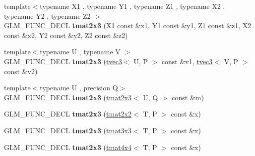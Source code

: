 \begin{DoxyCompactItemize}
\item 
{\footnotesize template$<$typename X1 , typename Y1 , typename Z1 , typename X2 , typename Y2 , typename Z2 $>$ }\\G\+L\+M\+\_\+\+F\+U\+N\+C\+\_\+\+D\+E\+CL {\bfseries tmat2x3} (X1 const \&x1, Y1 const \&y1, Z1 const \&z1, X2 const \&x2, Y2 const \&y2, Z2 const \&z2)\hypertarget{structglm_1_1detail_1_1tmat2x3_ac112d37bc3331b1735c1aeb591483bc0}{}\label{structglm_1_1detail_1_1tmat2x3_ac112d37bc3331b1735c1aeb591483bc0}

\item 
{\footnotesize template$<$typename U , typename V $>$ }\\G\+L\+M\+\_\+\+F\+U\+N\+C\+\_\+\+D\+E\+CL {\bfseries tmat2x3} (\hyperlink{structglm_1_1detail_1_1tvec3}{tvec3}$<$ U, P $>$ const \&v1, \hyperlink{structglm_1_1detail_1_1tvec3}{tvec3}$<$ V, P $>$ const \&v2)\hypertarget{structglm_1_1detail_1_1tmat2x3_ab39c2ee73d04fb527773418e6595be57}{}\label{structglm_1_1detail_1_1tmat2x3_ab39c2ee73d04fb527773418e6595be57}

\item 
{\footnotesize template$<$typename U , precision Q$>$ }\\G\+L\+M\+\_\+\+F\+U\+N\+C\+\_\+\+D\+E\+CL {\bfseries tmat2x3} (\hyperlink{structglm_1_1detail_1_1tmat2x3}{tmat2x3}$<$ U, Q $>$ const \&m)\hypertarget{structglm_1_1detail_1_1tmat2x3_aeada8034e24714a14c9d2480f5cf2fb6}{}\label{structglm_1_1detail_1_1tmat2x3_aeada8034e24714a14c9d2480f5cf2fb6}

\item 
G\+L\+M\+\_\+\+F\+U\+N\+C\+\_\+\+D\+E\+CL {\bfseries tmat2x3} (\hyperlink{structglm_1_1detail_1_1tmat2x2}{tmat2x2}$<$ T, P $>$ const \&x)\hypertarget{structglm_1_1detail_1_1tmat2x3_a37bd9202b87e73c3d6e36cadce414457}{}\label{structglm_1_1detail_1_1tmat2x3_a37bd9202b87e73c3d6e36cadce414457}

\item 
G\+L\+M\+\_\+\+F\+U\+N\+C\+\_\+\+D\+E\+CL {\bfseries tmat2x3} (\hyperlink{structglm_1_1detail_1_1tmat3x3}{tmat3x3}$<$ T, P $>$ const \&x)\hypertarget{structglm_1_1detail_1_1tmat2x3_a1f1c6b71411b314a015c589cbbe34f7a}{}\label{structglm_1_1detail_1_1tmat2x3_a1f1c6b71411b314a015c589cbbe34f7a}

\item 
G\+L\+M\+\_\+\+F\+U\+N\+C\+\_\+\+D\+E\+CL {\bfseries tmat2x3} (\hyperlink{structglm_1_1detail_1_1tmat4x4}{tmat4x4}$<$ T, P $>$ const \&x)\hypertarget{structglm_1_1detail_1_1tmat2x3_a4dc8800ba18dd4b395c68faf51009776}{}\label{structglm_1_1detail_1_1tmat2x3_a4dc8800ba18dd4b395c68faf51009776}


\end{DoxyCompactItemize}
